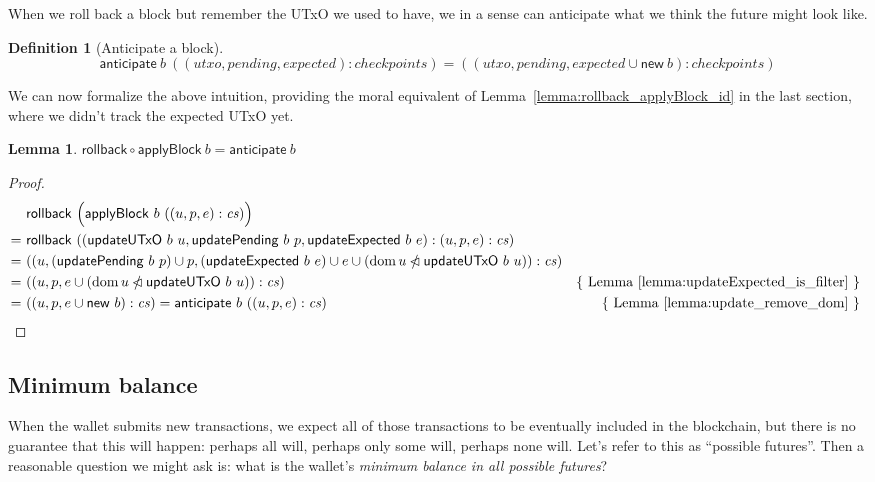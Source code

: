 \documentclass{article}
\newcommand{\restrictdom}{\lhd}
\newcommand{\subtractdom}{\mathbin{\slashed{\restrictdom}}}
\DeclareMathOperator{\dom}{dom}
\newtheorem{lemma}{Lemma}
\newtheorem{definition}{Definition}
\begin{document}
When we roll back a block but remember the UTxO we used to have, we in a sense
can anticipate what we think the future might look like.

\begin{definition}[Anticipate a block]
\begin{equation*}
  \mathsf{anticipate} ~ b ~ ((\mathit{utxo}, \mathit{pending}, \mathit{expected}) : \mathit{checkpoints})
= ((\mathit{utxo}, \mathit{pending}, \mathit{expected} \cup \mathsf{new} ~ b) : \mathit{checkpoints})
\end{equation*}
\end{definition}

We can now formalize the above intuition, providing the moral equivalent
of Lemma~\ref{lemma:rollback_applyBlock_id} in the last section, where we didn't
track the expected UTxO yet.

\begin{lemma}
\begin{math}
  \mathsf{rollback} \circ \mathsf{applyBlock} ~ b = \mathsf{anticipate} ~ b
\end{math}
\end{lemma}

\begin{proof}
\begin{align*}
  & ~ \mathsf{rollback} ~ \Bigl( \mathsf{applyBlock} ~ b ~ ((u, p, e) : \mathit{cs}) \Bigr) \\
= & ~ \mathsf{rollback} ~ ((\mathsf{updateUTxO} ~ b ~ u, \mathsf{updatePending} ~ b ~ p, \mathsf{updateExpected} ~ b ~ e) : (u, p, e) : \mathit{cs}) \\
= & ~ ((u, (\mathsf{updatePending} ~ b ~ p) \cup p,  (\mathsf{updateExpected} ~ b ~ e) \cup e \cup (\dom u \subtractdom \mathsf{updateUTxO} ~ b ~ u)) : \mathit{cs}) \\
= & ~ ((u, p, e \cup (\dom u \subtractdom \mathsf{updateUTxO} ~ b ~ u)) : \mathit{cs}) & \text{\{ Lemma~\ref{lemma:updateExpected_is_filter} \} } \\
= & ~ ((u, p, e \cup \mathsf{new} ~ b) : \mathit{cs}) = \mathsf{anticipate} ~ b ~ ((u, p, e) : \mathit{cs}) & \text{\{ Lemma~\ref{lemma:update_remove_dom} \} }
\end{align*}
\end{proof}

\subsection{Minimum balance}

When the wallet submits new transactions, we expect all of those transactions
to be eventually included in the blockchain, but there is no guarantee that this
will happen: perhaps all will, perhaps only some will, perhaps none will. Let's
refer to this as ``possible futures''. Then a reasonable question we might ask
is: what is the wallet's \emph{minimum balance in all possible futures}?
\end{document}
